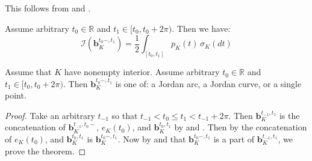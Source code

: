This follows from  and .

\begin{corollary}

Assume arbitrary \(t_0 \in \mathbb{R}\) and \(t_1 \in [t_0, t_0 + 2\pi)\). Then we have:
\[
\mathcal{I} \left( \mathbf{b}_{K}^{t_0-, t_1} \right) = \frac{1}{2} \int_{[t_0, t_1]}p_K(t)\,\sigma_K(dt)
\]

\label{cor:closed-param-curve-area-functional}
\end{corollary}

\begin{theorem}

Assume that \(K\) have nonempty interior. Assume arbitrary \(t_0 \in \mathbb{R}\) and \(t_1 \in [t_0, t_0 + 2\pi)\). Then \(\mathbf{b}_K^{t_0-, t_1}\) is one of: a Jordan arc, a Jordan curve, or a single point.

\label{thm:closed-param-positive-jordan}
\end{theorem}

\begin{proof}
Take an arbitrary \(t_{-1}\) so that \(t_{-1} < t_0 \leq t_1 < t_{-1} + 2\pi\). Then \(\mathbf{b}_K^{t_{-1}, t_1}\) is the concatenation of \(\mathbf{b}_K^{t_{-1}, t_0-}\), \(e_K(t_0)\), and \(\mathbf{b}_K^{t_0, t_1}\) by  and . Then by  the concatenation of \(e_K(t_0)\), and \(\mathbf{b}_K^{t_0, t_1}\) is \(\mathbf{b}_K^{t_0-, t_1}\). Now by  and that \(\mathbf{b}_K^{t_0-, t_1}\) is a part of \(\mathbf{b}_K^{t_{-1}, t_1}\), we prove the theorem.
\end{proof}